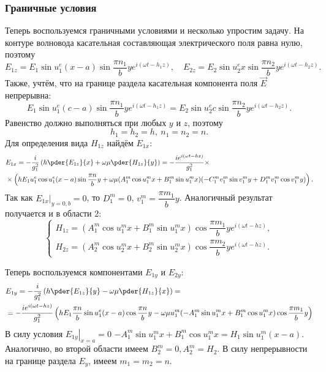 \documentclass[12pt]{hedsemwork}
\renewcommand{\frac}{\dfrac}
\begin{document}
\subsubsection{Граничные условия}
Теперь воспользуемся граничными условиями и несколько упростим задачу.
На контуре волновода касательная составляющая электрического поля равна нулю,
поэтому
    \[
        E_{1z} = E_1\sin u^e_1 (x-a) \sin \frac{\pi n_1}{b}y
        e^{i(\omega t - h_1 z)},\quad
        E_{2z} = E_2\sin u^e_2 x \sin \frac{\pi n_2}{b}y
        e^{i(\omega t - h_2 z)}.
    \]
Также, учтём, что на границе раздела касательная компонента поля \( \vec{E} \)
непрерывна:
    \[
        E_1\sin u^e_1 (c-a) \sin \frac{\pi n_1}{b}y
        e^{i(\omega t - h_1 z)} =
        E_2\sin u^e_2 c \sin \frac{\pi n_2}{b}y
        e^{i(\omega t - h_2 z)}.
    \]
Равенство должно выполняться при любых \( y \) и \( z \), поэтому
\[
    \boxed{h_1 = h_2 = h,\ n_1 = n_2 = n.}
\]
Для определения вида \( H_{1z} \) найдём \( E_{1x} \):
\begin{align*}
    & E_{1x} =
    -\frac{i}{g_1^2}\left( h\pder{E_{1z}}{x} + \omega\mu\pder{H_{1z}}{y} \right)
    = -\frac{ie^{i(\omega t - h z)}}{g_1^2}\times\\
    &\times\left( h E_1 u^e_1 \cos u^e_1(x-a)\sin\frac{\pi n}{b}y +
    \omega\mu(A^m_1\cos u^m_1 x + B^m_1\sin u^m_1 x)
    (-C^m_1 v^m_1 \sin v^m_1 y + D^m_1 v^m_1 \cos v^m_1 y)\right).
\end{align*}
Так как \( \left.E_{1x}\right|_{y=0,b} = 0 \), то \( D^m_1 = 0 \),
\( v^m_1 = \frac{\pi m_1}{b} y \). Аналогичный результат получается и в области
2:
\[
    \left\{
    \begin{array}{l}
        H_{1z} =
        (A^m_1\cos u^m_1 x + B^m_1\sin u^m_1 x)\cos\frac{\pi m_1}{b}y
        e^{i(\omega t - h z)}, \\
        H_{2z} =
        (A^m_2\cos u^m_2 x + B^m_2\sin u^m_2 x)\cos\frac{\pi m_2}{b}y
        e^{i(\omega t - h z)}.
    \end{array}
    \right.
\]

Теперь воспользуемся компонентами \( E_{1y} \) и \( E_{2y} \):
\begin{align*}
    & E_{1y} = -\frac{i}{g_1^2}\left( h\pder{E_{1z}}{y} -
    \omega\mu\pder{H_{1z}}{x} \right) = \\
    & = -\frac{ie^{i(\omega t - hz)}}{g_1^2}\left( h E_1 \frac{\pi n}{b}
    \sin u^e_1(x-a)\cos\frac{\pi n}{b}y - \omega\mu
    u^m_1 (-A^m_1 \sin u^m_1 x + B^m_1\cos u^m_1 x)\cos\frac{\pi m_1}{b}y
   \right)
\end{align*}
В силу условия \( \left.E_{1y}\right|_{x=a} = 0 \)
\( -A^m_1 \sin u^m_1 x + B^m_1\cos u^m_1 x = H_1\sin u^m_1(x-a) \).
Аналогично, во второй области имеем \(B^m_2=0, A^m_2 = H_2\).
В силу непрерывности на границе раздела \( E_y \), имеем \( m_1 = m_2 = n \).
\end{document}
